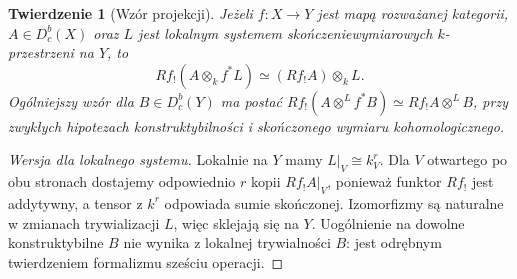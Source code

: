 \documentclass[11pt,a4paper,oneside]{report}
\theoremstyle{plain}
\newtheorem{twierdzenie}{Twierdzenie}[section]
\theoremstyle{definition}
\theoremstyle{remark}
\begin{document}
\begin{twierdzenie}[Wzór projekcji]
\label{thm:xvi-projection}
Jeżeli $f:X\to Y$ jest mapą rozważanej kategorii,
$A\in D^b_c(X)$ oraz $L$ jest lokalnym systemem
skończeniewymiarowych $k$-przestrzeni na $Y$, to
\[
Rf_!(A\otimes_k f^*L)\simeq (Rf_!A)\otimes_k L.
\]
Ogólniejszy wzór dla $B\in D^b_c(Y)$ ma postać
$Rf_!(A\otimes^L f^*B)\simeq Rf_!A\otimes^L B$,
przy zwykłych hipotezach konstruktybilności i
skończonego wymiaru kohomologicznego.
\end{twierdzenie}
\begin{proof}[Wersja dla lokalnego systemu]
Lokalnie na $Y$ mamy $L|_V\cong k_V^r$.
Dla $V$ otwartego po obu stronach dostajemy
odpowiednio $r$ kopii $Rf_!A|_V$, ponieważ
funktor $Rf_!$ jest addytywny, a tensor z $k^r$
odpowiada sumie skończonej. Izomorfizmy są naturalne
w zmianach trywializacji $L$, więc sklejają się na $Y$.
Uogólnienie na dowolne konstruktybilne $B$ nie wynika
z lokalnej trywialności $B$: jest odrębnym twierdzeniem
formalizmu sześciu operacji.
\end{proof}
\end{document}
